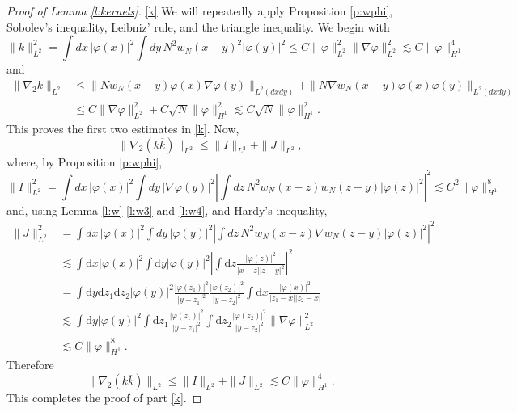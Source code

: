 \documentclass[11pt,a4paper,draft,DIV11]{scrartcl}	%
\newcommand{\di}{\textrm{d}}		%
\newcommand{\norm}[1]{\lVert#1\rVert}	%
\begin{document}
\begin{proof}[Proof of Lemma \ref{l:kernels}]
\hspace{-0.3em} %
\ref{k} We will repeatedly apply Proposition \ref{p:wphi}, Sobolev's
  inequality, Leibniz' rule, and the triangle inequality. We begin with
  \[
    \| k \|_{L^2}^2 = \int dx \, |\varphi(x)|^2 \int dy \, N^2 w_N(x-y)^2
    |\varphi(y)|^2 \le C \| \varphi \|_{L^2}^2 \| \nabla \varphi \|_{L^2}^2
    \apprle C \| \varphi \|_{H^1}^4
  \]
  and
  \begin{align*}
    \| \nabla_2 k \|_{L^2} & \le \| N w_N(x-y) \varphi(x) \nabla \varphi(y)
    \|_{L^2(dx dy)} + \| N \nabla w_N(x-y) \varphi(x) \varphi(y) \|_{L^2(dx dy)} \\
    & \le C \| \nabla \varphi \|_{L^2}^2 + C \sqrt{N} \| \varphi \|_{H^1}^2
    \apprle C \sqrt{N} \| \varphi \|_{H^1}^2.
  \end{align*}
  This proves the first two estimates in \ref{k}. Now,
  \[
    \| \nabla_2 (k \overline{k}) \|_{L^2} \le \| I \|_{L^2} + \| J \|_{L^2},
  \]
  where, by Proposition \ref{p:wphi},
  \[
    \| I \|_{L^2}^2 = \int dx \, |\varphi(x)|^2 \int dy \, |\nabla
    \varphi(y)|^2 \left| \int dz \, N^2 w_N(x-z) w_N(z-y) |\varphi(z)|^2
    \right|^2 \apprle C^2 \| \varphi \|_{H^1}^8
  \]
  and, using Lemma \ref{l:w} \ref{l:w3} and \ref{l:w4}, and Hardy's inequality,
  \begin{align*}
    \| J \|_{L^2}^2 & = \int dx \, |\varphi(x)|^2 \int dy \, |\varphi(y)|^2
    \left| \int dz \, N^2 w_N(x-z) \nabla w_N(z-y) |\varphi(z)|^2 \right|^2 \\
& \apprle \int \di x\lvert\varphi(x)\rvert^2 \int \di y \lvert \varphi(y)\rvert^2
\left\lvert \int \di z \frac{\lvert\varphi(z)\rvert^2}{\lvert x-z\rvert
\lvert z-y\rvert^2} \right\rvert^2 \\
& = \int \di y\di z_1 \di z_2 \lvert \varphi(y)\rvert^2 \frac{\lvert \varphi(z_1)\rvert^2}{\lvert y-z_1\rvert^2} \frac{\lvert\varphi(z_2)\rvert^2}{\lvert y-z_2\rvert^2} \int \di x \frac{\lvert \varphi(x)\rvert^2}{\lvert z_1-x\rvert \lvert z_2 - x\rvert} \\
& \apprle \int \di y \lvert \varphi(y)\rvert^2 \int \di z_1 \frac{\lvert \varphi(z_1)\rvert^2}{\lvert y-z_1\rvert^2} \int \di z_2 \frac{\lvert \varphi(z_2)\rvert^2}{\lvert y-z_2\rvert^2} \norm{\nabla \varphi}_{L^2}^2\\
& \apprle C \norm{\varphi}_{H^1}^8.
  \end{align*}
  Therefore
  \[
    \| \nabla_2 (k \overline{k}) \|_{L^2} \le \| I \|_{L^2} + \| J \|_{L^2}
    \apprle C \| \varphi \|_{H^1}^4.
  \]
  This completes the proof of part \ref{k}.


\end{proof}
\end{document}

